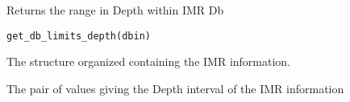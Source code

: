 %
\begin{Description}\relax
Returns the range in Depth within IMR Db
\end{Description}
%
\begin{Usage}
\begin{verbatim}
get_db_limits_depth(dbin)
\end{verbatim}
\end{Usage}
%
\begin{Arguments}
\begin{ldescription}
\item[\code{dbin}] 
The  structure organized containing the IMR
information.

\end{ldescription}
\end{Arguments}
%
\begin{Value}
The pair of values giving the Depth interval of the IMR information
\end{Value}
